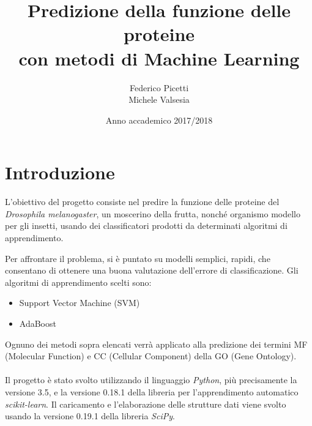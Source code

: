 \documentclass[12pt,a4paper,oneside,hidelinks]{report}
\begin{document}

\title{%
        Predizione della funzione delle proteine \\
        con metodi di Machine Learning}
  
\author{Federico Picetti \\
        Michele Valsesia}

\date{Anno accademico 2017/2018} 

\maketitle

\tableofcontents


\newpage

\section*{Introduzione}
L'obiettivo del progetto consiste nel predire la funzione delle proteine del \textit{Drosophila melanogaster}, un moscerino della frutta, nonché organismo modello per gli insetti, usando dei classificatori prodotti da determinati algoritmi di apprendimento. 

Per affrontare il problema, si è puntato su modelli semplici, rapidi, che consentano di ottenere una buona valutazione dell'errore di classificazione. Gli algoritmi di apprendimento scelti sono: 

\begin{itemize}
    \item Support Vector Machine (SVM)
    \item AdaBoost
\end{itemize}

Ognuno dei metodi sopra elencati verrà applicato alla predizione dei termini MF (Molecular Function) e CC (Cellular Component) della GO (Gene Ontology).

\paragraph*{}
Il progetto è stato svolto utilizzando il linguaggio \textit{Python}, più precisamente la versione 3.5, e la versione 0.18.1 della libreria per l'apprendimento automatico \textit{scikit-learn}. Il caricamento e l'elaborazione delle strutture dati viene svolto usando la versione 0.19.1 della libreria \textit{SciPy}.
\end{document}
